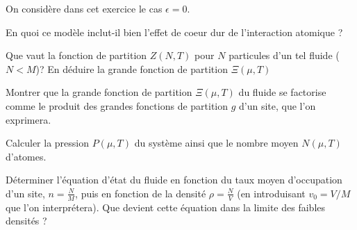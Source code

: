 On considère dans cet exercice le cas $\epsilon=0$.

\medskip

\question
En quoi ce modèle inclut-il bien l'effet de coeur dur de l'interaction atomique ?
 
\question
Que vaut la fonction de partition $Z(N,T)$ pour $N$ particules d'un tel fluide  ($N<M$)? En déduire la grande fonction de partition $\Xi(\mu,T)$

\question
Montrer que la grande fonction de partition $\Xi(\mu,T)$ du fluide se factorise comme le produit des grandes fonctions de partition $g$ d'un site, que l'on exprimera.

\question
Calculer la pression $P(\mu,T)$ du système ainsi que le nombre moyen $N(\mu,T)$ d'atomes. 

\question
Déterminer l'équation d'état du fluide en fonction du taux moyen d'occupation d'un site, $n=\frac{N}{M}$, puis en fonction de la densité $\rho=\frac{N}{V}$ (en introduisant $v_0=V/M$ que l'on interprétera).  Que devient cette équation dans la limite des faibles densités ?
